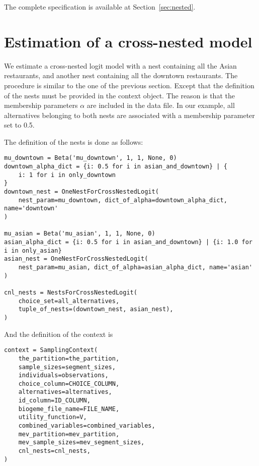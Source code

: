 \documentclass[12pt,a4paper]{article}
\begin{document}
The complete specification is available at Section~\ref{sec:nested}.

\section{Estimation of a cross-nested model}
We estimate a cross-nested logit model with a nest containing all the
Asian restaurants, and another nest containing all the downtown
restaurants. The procedure is similar to the one of the previous
section. Except that the definition of the nests must be provided in
the context object. The reason is that the membership parameters
$\alpha$ are included in the data file. In our example, all
alternatives belonging to both nests are associated with a membership
parameter set to 0.5.

The definition of the nests is done as follows:
\begin{lstlisting}
mu_downtown = Beta('mu_downtown', 1, 1, None, 0)
downtown_alpha_dict = {i: 0.5 for i in asian_and_downtown} | {
    i: 1 for i in only_downtown
}
downtown_nest = OneNestForCrossNestedLogit(
    nest_param=mu_downtown, dict_of_alpha=downtown_alpha_dict, name='downtown'
)

mu_asian = Beta('mu_asian', 1, 1, None, 0)
asian_alpha_dict = {i: 0.5 for i in asian_and_downtown} | {i: 1.0 for i in only_asian}
asian_nest = OneNestForCrossNestedLogit(
    nest_param=mu_asian, dict_of_alpha=asian_alpha_dict, name='asian'
)

cnl_nests = NestsForCrossNestedLogit(
    choice_set=all_alternatives,
    tuple_of_nests=(downtown_nest, asian_nest),
)
\end{lstlisting}
And the definition of the context is
\begin{lstlisting}
context = SamplingContext(
    the_partition=the_partition,
    sample_sizes=segment_sizes,
    individuals=observations,
    choice_column=CHOICE_COLUMN,
    alternatives=alternatives,
    id_column=ID_COLUMN,
    biogeme_file_name=FILE_NAME,
    utility_function=V,
    combined_variables=combined_variables,
    mev_partition=mev_partition,
    mev_sample_sizes=mev_segment_sizes,
    cnl_nests=cnl_nests,
)
\end{lstlisting}
\end{document}

